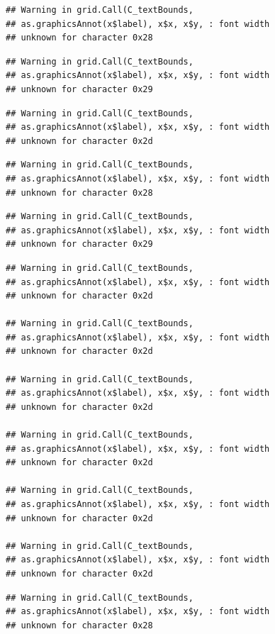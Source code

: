 \documentclass[
]{book}
\begin{document}
\begin{verbatim}
## Warning in grid.Call(C_textBounds,
## as.graphicsAnnot(x$label), x$x, x$y, : font width
## unknown for character 0x28
\end{verbatim}

\begin{verbatim}
## Warning in grid.Call(C_textBounds,
## as.graphicsAnnot(x$label), x$x, x$y, : font width
## unknown for character 0x29
\end{verbatim}

\begin{verbatim}
## Warning in grid.Call(C_textBounds,
## as.graphicsAnnot(x$label), x$x, x$y, : font width
## unknown for character 0x2d
\end{verbatim}

\begin{verbatim}
## Warning in grid.Call(C_textBounds,
## as.graphicsAnnot(x$label), x$x, x$y, : font width
## unknown for character 0x28
\end{verbatim}

\begin{verbatim}
## Warning in grid.Call(C_textBounds,
## as.graphicsAnnot(x$label), x$x, x$y, : font width
## unknown for character 0x29
\end{verbatim}

\begin{verbatim}
## Warning in grid.Call(C_textBounds,
## as.graphicsAnnot(x$label), x$x, x$y, : font width
## unknown for character 0x2d

## Warning in grid.Call(C_textBounds,
## as.graphicsAnnot(x$label), x$x, x$y, : font width
## unknown for character 0x2d

## Warning in grid.Call(C_textBounds,
## as.graphicsAnnot(x$label), x$x, x$y, : font width
## unknown for character 0x2d

## Warning in grid.Call(C_textBounds,
## as.graphicsAnnot(x$label), x$x, x$y, : font width
## unknown for character 0x2d

## Warning in grid.Call(C_textBounds,
## as.graphicsAnnot(x$label), x$x, x$y, : font width
## unknown for character 0x2d

## Warning in grid.Call(C_textBounds,
## as.graphicsAnnot(x$label), x$x, x$y, : font width
## unknown for character 0x2d
\end{verbatim}

\begin{verbatim}
## Warning in grid.Call(C_textBounds,
## as.graphicsAnnot(x$label), x$x, x$y, : font width
## unknown for character 0x28
\end{verbatim}
\end{document}

